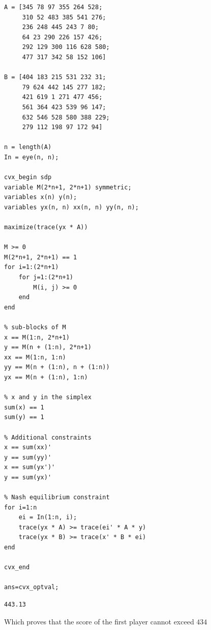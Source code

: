 \documentclass[11pt]{article}
\begin{document}
\begin{verbatim}
A = [345 78 97 355 264 528;
     310 52 483 385 541 276;
     236 248 445 243 7 80;
     64 23 290 226 157 426;
     292 129 300 116 628 580;
     477 317 342 58 152 106]

B = [404 183 215 531 232 31;
     79 624 442 145 277 182;
     421 619 1 271 477 456;
     561 364 423 539 96 147;
     632 546 528 580 388 229;
     279 112 198 97 172 94]

n = length(A)
In = eye(n, n);

cvx_begin sdp
variable M(2*n+1, 2*n+1) symmetric;
variables x(n) y(n);
variables yx(n, n) xx(n, n) yy(n, n);

maximize(trace(yx * A))

M >= 0
M(2*n+1, 2*n+1) == 1
for i=1:(2*n+1)  
    for j=1:(2*n+1)
        M(i, j) >= 0
    end  
end

% sub-blocks of M
x == M(1:n, 2*n+1)
y == M(n + (1:n), 2*n+1)
xx == M(1:n, 1:n)
yy == M(n + (1:n), n + (1:n))
yx == M(n + (1:n), 1:n)

% x and y in the simplex
sum(x) == 1
sum(y) == 1

% Additional constraints
x == sum(xx)'
y == sum(yy)'
x == sum(yx')'
y == sum(yx)'

% Nash equilibrium constraint
for i=1:n
    ei = In(1:n, i);
    trace(yx * A) >= trace(ei' * A * y)
    trace(yx * B) >= trace(x' * B * ei)
end

cvx_end

ans=cvx_optval;
\end{verbatim}

\begin{verbatim}
443.13
\end{verbatim}





Which proves that the score of the first player cannot exceed \(434\)
\end{document}
